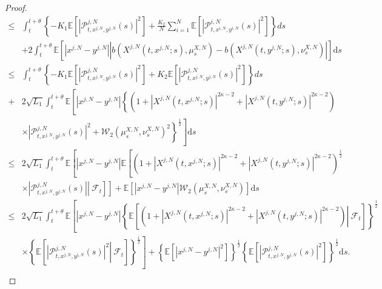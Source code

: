 \documentclass[12pt]{article}
\numberwithin{equation}{section}
\begin{document}
\begin{proof}
\begin{equation}
\begin{aligned}
\le &\int_t^{t+\theta}{\left\{ -K_1\mathbb{E} \left[ \left|\mathcal{P} _{t,x^{j,N},y^{j,N}}^{j,N}\left( s \right) \right|^2 \right] +\tfrac{K_2}{N}\sum_{i=1}^N{\mathbb{E} \left[ \left|\mathcal{P} _{t,x^{i,N},y^{i,N}}^{i,N}\left(s\right)\right|^2 \right]} \right\}}ds\\
&+2\int_t^{t+\theta}{\mathbb{E}\left[ \left|x^{j,N}-y^{j,N}\right|\left|b\left(X^{j,N}\left(t,x^{j,N};s\right),\mu _{s}^{X,N}\right)-b\left(X^{j,N}\left(t,y^{j,N};s\right),\nu _{s}^{X,N}\right)\right| \right]} \mathrm{d}s\\
\le &\int_t^{t+\theta}{\left\{ -K_1\mathbb{E} \left[ \left|\mathcal{P} _{t,x^{j,N},y^{j,N}}^{j,N}\left( s \right) \right|^2 \right] +K_2\mathbb{E} \left[ \left|\mathcal{P} _{t,x^{j,N},y^{j,N}}^{j,N}\left(s\right)\right|^2 \right] \right\}}ds\\
+&2\sqrt{L_1}\int_t^{t+\theta}\mathbb{E}\left[\left|x^{j,N}-y^{j,N}\right|\left\{ \left(1+\left|X^{j,N}\left(t,x^{j,N};s\right)\right|^{2\kappa -2}+\left|X^{j,N}\left(t,y^{j,N};s\right)\right|^{2\kappa -2}\right) \right.\right.\\
&\times\left. \left.\left| \mathcal{P} _{t,x^{j,N},y^{j,N}}^{j,N}\left( s \right) \right|^2+\mathcal{W} _2\left( \mu _{s}^{X,N},\nu _{s}^{X,N} \right) ^2 \right\} ^{\frac{1}{2}}\right]\mathrm{d}s\\
\le &2\sqrt{L_1}\int_t^{t+\theta}\mathbb{E}\left[\left|x^{j,N}-y^{j,N}\right|\mathbb{E} \left[ \left(1+\left|X^{j,N}\left(t,x^{j,N};s\right)\right|^{2\kappa -2}+\left|X^{j,N}\left(t,y^{j,N};s\right)\right|^{2\kappa -2}\right)^{\frac{1}{2}}\right. \right.\\
&\times\left. \left. \left. \left| \mathcal{P} _{t,x^{j,N},y^{j,N}}^{j,N}\left( s \right) \right|\right\rvert\ \mathcal{F} _t  \right] \right] +\mathbb{E} \left[ \left|x^{j,N}-y^{j,N}\right|\mathcal{W} _2\left( \mu _{s}^{X,N},\nu _{s}^{X,N} \right) \right] \mathrm{d}s\\
\le&2\sqrt{L_1}\int_t^{t+\theta}\mathbb{E}\left[\left|x^{j,N}-y^{j,N}\right|\left\{ \mathbb{E} \left[\left.\left(1+\left|X^{j,N}\left(t,x^{j,N};s\right)\right|^{2\kappa -2}+\left|X^{j,N}\left(t,y^{j,N};s\right)\right|^{2\kappa -2}\right)\right\rvert\ \mathcal{F} _t \right] \right\} ^{\frac{1}{2}}\right.\\
&\times\left.  \left\{ \mathbb{E} \left[\left. \left| \mathcal{P} _{t,x^{j,N},y^{j,N}}^{j,N}\left( s \right) \right|^2 \right\rvert\ \mathcal{F} _t  \right] \right\} ^{\frac{1}{2}} \right] +\left\{ \mathbb{E} \left[ \left|x^{j,N}-y^{j,N}\right|^2 \right] \right\} ^{\frac{1}{2}}\left\{ \mathbb{E} \left[ \left| \mathcal{P} _{t,x^{j,N},y^{j,N}}^{j,N}\left( s \right) \right|^2 \right] \right\} ^{\frac{1}{2}}\mathrm{d}s.\\

\end{aligned}
\end{equation}
\end{proof}
\end{document}
